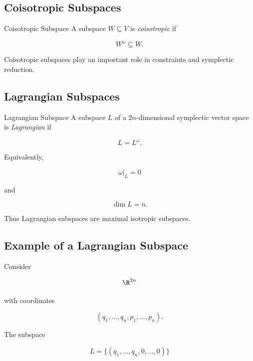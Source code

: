 \subsection{Coisotropic Subspaces}
\label{subsec:coisotropic-subspaces}

\begin{definitionbox}{Coisotropic Subspace}
A subspace \(W\subseteq V\) is \emph{coisotropic} if

\[
\boxed{
W^\omega\subseteq W.
}
\]
\end{definitionbox}

Coisotropic subspaces play an important role in constraints and symplectic
reduction.

\subsection{Lagrangian Subspaces}
\label{subsec:lagrangian-subspaces}

\begin{definitionbox}{Lagrangian Subspace}
A subspace \(L\) of a \(2n\)-dimensional symplectic vector space is
\emph{Lagrangian} if

\[
\boxed{
L=L^\omega.
}
\]
\end{definitionbox}

Equivalently,

\[
\boxed{
\omega|_L=0
}
\]

and

\[
\boxed{
\dim L=n.
}
\]

Thus Lagrangian subspaces are maximal isotropic subspaces.

\subsection{Example of a Lagrangian Subspace}
\label{subsec:lagrangian-subspace-example}

Consider

\[
\R^{2n}
\]

with coordinates

\[
(q_1,\ldots,q_n,p_1,\ldots,p_n).
\]

The subspace

\[
\boxed{
L=
\{(q_1,\ldots,q_n,0,\ldots,0)\}
}
\]

